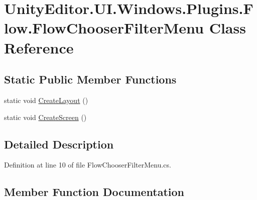 \hypertarget{class_unity_editor_1_1_u_i_1_1_windows_1_1_plugins_1_1_flow_1_1_flow_chooser_filter_menu}{}\section{Unity\+Editor.\+U\+I.\+Windows.\+Plugins.\+Flow.\+Flow\+Chooser\+Filter\+Menu Class Reference}
\label{class_unity_editor_1_1_u_i_1_1_windows_1_1_plugins_1_1_flow_1_1_flow_chooser_filter_menu}
\subsection*{Static Public Member Functions}
\begin{DoxyCompactItemize}
\item 
static void \hyperlink{class_unity_editor_1_1_u_i_1_1_windows_1_1_plugins_1_1_flow_1_1_flow_chooser_filter_menu_abb73918e240885aebbe15095696a8faa}{Create\+Layout} ()
\item 
static void \hyperlink{class_unity_editor_1_1_u_i_1_1_windows_1_1_plugins_1_1_flow_1_1_flow_chooser_filter_menu_a6920d49debc3a436058f355c6e88dd9d}{Create\+Screen} ()
\end{DoxyCompactItemize}


\subsection{Detailed Description}


Definition at line 10 of file Flow\+Chooser\+Filter\+Menu.\+cs.



\subsection{Member Function Documentation}
\hypertarget{class_unity_editor_1_1_u_i_1_1_windows_1_1_plugins_1_1_flow_1_1_flow_chooser_filter_menu_abb73918e240885aebbe15095696a8faa}{}
